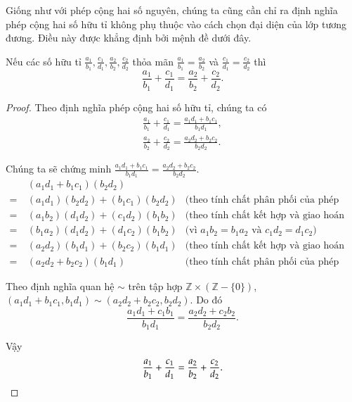 Giống như với phép cộng hai số nguyên, chúng ta cũng cần chỉ ra định nghĩa phép cộng hai số hữu tỉ không phụ thuộc vào cách chọn đại diện của lớp tương đương. Điều này được khẳng định bởi mệnh đề dưới đây.
\begin{proposition}
	Nếu các số hữu tỉ $\frac{a_{1}}{b_{1}}, \frac{c_{1}}{d_{1}}, \frac{a_{2}}{b_{2}}, \frac{c_{2}}{d_{2}}$ thỏa mãn $\frac{a_{1}}{b_{1}} = \frac{a_{2}}{b_{2}}$ và $\frac{c_{1}}{d_{1}} = \frac{c_{2}}{d_{2}}$ thì
	\[
		\frac{a_{1}}{b_{1}} + \frac{c_{1}}{d_{1}} = \frac{a_{2}}{b_{2}} + \frac{c_{2}}{d_{2}}.
	\]
\end{proposition}

\begin{proof}
	Theo định nghĩa phép cộng hai số hữu tỉ, chúng ta có
	\[
		\begin{split}
			\frac{a_{1}}{b_{1}} + \frac{c_{1}}{d_{1}} = \frac{a_{1} d_{1} + b_{1} c_{1}}{b_{1} d_{1}}, \\
			\frac{a_{2}}{b_{2}} + \frac{c_{2}}{d_{2}} = \frac{a_{2} d_{2} + b_{2} c_{2}}{b_{2} d_{2}}.
		\end{split}
	\]

	Chúng ta sẽ chứng minh $\frac{a_{1} d_{1} + b_{1} c_{1}}{b_{1} d_{1}} = \frac{a_{2} d_{2} + b_{2} c_{2}}{b_{2} d_{2}}$.
	\begin{align*}
		    & (a_{1} d_{1} + b_{1} c_{1}) (b_{2} d_{2})                                                                                           \\
		=\  & (a_{1} d_{1}) (b_{2} d_{2}) + (b_{1} c_{1}) (b_{2} d_{2}) & \text{(theo tính chất phân phối của phép nhân với phép cộng số nguyên)} \\
		=\  & (a_{1} b_{2}) (d_{1} d_{2}) + (c_{1} d_{2}) (b_{1} b_{2}) & \text{(theo tính chất kết hợp và giao hoán của phép nhân số nguyên)}    \\
		=\  & (b_{1} a_{2}) (d_{1} d_{2}) + (d_{1} c_{2}) (b_{1} b_{2}) & \text{(vì $a_{1} b_{2} = b_{1} a_{2}$ và $c_{1} d_{2} = d_{1} c_{2}$)}  \\
		=\  & (a_{2} d_{2}) (b_{1} d_{1}) + (b_{2} c_{2}) (b_{1} d_{1}) & \text{(theo tính chất kết hợp và giao hoán của phép nhân số nguyên)}    \\
		=\  & (a_{2} d_{2} + b_{2} c_{2}) (b_{1} d_{1})                 & \text{(theo tính chất phân phối của phép nhân với phép cộng số nguyên)}
	\end{align*}

	Theo định nghĩa quan hệ $\sim$ trên tập hợp $\mathbb{Z}\times(\mathbb{Z} - \{0\})$, $(a_{1} d_{1} + b_{1} c_{1}, b_{1} d_{1}) \sim (a_{2} d_{2} + b_{2} c_{2}, b_{2} d_{2})$. Do đó
	\[
		\frac{a_{1} d_{1} + c_{1} b_{1}}{b_{1} d_{1}} = \frac{a_{2} d_{2} + c_{2} b_{2}}{b_{2} d_{2}}.
	\]

	Vậy
	\[
		\frac{a_{1}}{b_{1}} + \frac{c_{1}}{d_{1}} = \frac{a_{2}}{b_{2}} + \frac{c_{2}}{d_{2}}.\qedhere
	\]
\end{proof}

